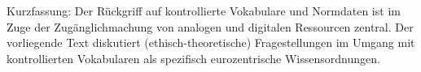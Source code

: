 Kurzfassung: Der Rückgriff auf kontrollierte Vokabulare und Normdaten
ist im Zuge der Zugänglichmachung von analogen und digitalen Ressourcen
zentral. Der vorliegende Text diskutiert (ethisch-theoretische)
Fragestellungen im Umgang mit kontrollierten Vokabularen als spezifisch
eurozentrische Wissensordnungen.
